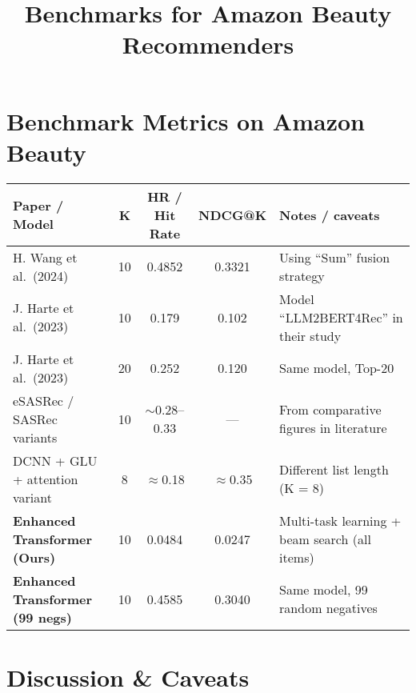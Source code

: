 \documentclass[12pt]{article}
\title{Benchmarks for Amazon Beauty Recommenders}
\author{}
\date{}
\begin{document}
\maketitle

\section*{Benchmark Metrics on Amazon Beauty}

\begin{tabular}{@{} l c c c l @{}}
\toprule
\textbf{Paper / Model} & \textbf{K} & \textbf{HR / Hit Rate} & \textbf{NDCG@K} & \textbf{Notes / caveats} \\
\midrule
H. Wang et al.\ (2024) & 10 & 0.4852 & 0.3321 & Using “Sum” fusion strategy \\
J. Harte et al.\ (2023) & 10 & 0.179 & 0.102 & Model “LLM2BERT4Rec” in their study \\
J. Harte et al.\ (2023) & 20 & 0.252 & 0.120 & Same model, Top-20 \\
eSASRec / SASRec variants & 10 & $\sim$0.28–0.33 & — & From comparative figures in literature \\
DCNN + GLU + attention variant & 8 & $\approx$0.18 & $\approx$0.35 & Different list length (K = 8) \\
\textbf{Enhanced Transformer (Ours)} & 10 & 0.0484 & 0.0247 & Multi-task learning + beam search (all items) \\
\textbf{Enhanced Transformer (99 negs)} & 10 & 0.4585 & 0.3040 & Same model, 99 random negatives \\
\bottomrule
\end{tabular}

\section*{Discussion \& Caveats}
\end{document}
